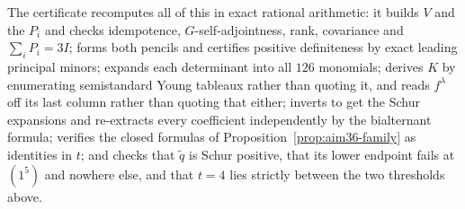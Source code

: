 The certificate  recomputes all
of this in exact rational arithmetic: it builds $V$ and the $P_i$ and checks
idempotence, $G$-self-adjointness, rank, covariance and $\sum_iP_i=3I$; forms
both pencils and certifies positive definiteness by exact leading principal
minors; expands each determinant into all $126$ monomials; derives $K$ by
enumerating semistandard Young tableaux rather than quoting it, and reads
$f^\lambda$ off its last column rather than quoting that either; inverts to get
the Schur expansions and re-extracts every coefficient independently by the
bialternant formula; verifies the closed formulas of
Proposition~\ref{prop:aim36-family} as identities in $t$; and checks that
$\widetilde q$ is Schur positive, that its lower endpoint fails at $(1^5)$ and
nowhere else, and that $t=4$ lies strictly between the two thresholds above.

